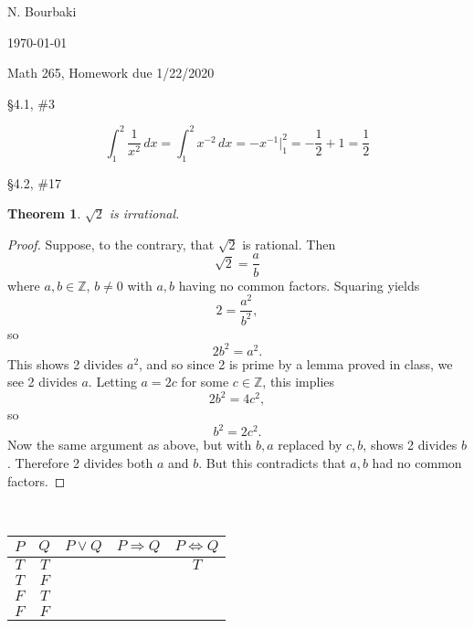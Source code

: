 \documentclass[11pt]{report}
\theoremstyle{plain}
\newtheorem{thm}{Theorem}
\begin{document}
\hfill N. Bourbaki

\hfill \today

\begin{center}
Math 265, Homework due 1/22/2020
\end{center}
\begin{description}
\item{\S 4.1, \#3}

$$\int_1^2 \frac 1 {x^2} \, dx=\int_1^2 x^{-2} \, dx=-x^{-1} \Big |_1^2=-\frac 12+1=\frac 12$$

\item{\S 4.2, \#17}

\begin{thm} $\sqrt 2$ is irrational.
\end{thm}
\begin{proof}
Suppose, to the contrary, that $\sqrt 2$ is rational. Then
$$\sqrt 2=\frac ab$$
where $a,b\in \mathbb Z$, $b\not = 0$ with $a,b$ having no common factors. Squaring yields
$$2=\frac {a^2}{b^2},$$
so
$$2b^2=a^2.$$
This shows 2 divides $a^2$, and so since 2 is prime by a lemma proved in class, we see 2 divides $a$. Letting $a=2c$ for some $c\in \mathbb Z$, this implies
$$2b^2=4c^2,$$ so
$$b^2=2c^2.$$
Now the same argument as above, but with $b,a$ replaced by $c,b$, shows 2 divides $b$. Therefore 2 divides both $a$ and $b$. But this contradicts that $a,b$ had no common factors.
\end{proof}


\item[\S 99.99, \#99]

\ 

\begin{tabular}{c|c|c|c|c}

$P$ & $Q$ & $P\lor Q$ & $P\Rightarrow Q$ & $P \iff Q$ \\
\hline
$T$  & $T$ & & & $T$ \\
$T$  & $F$ & & & \\
$F$  & $T$ & & & \\
$F$  & $F$ & & & \\
\end{tabular}


\end{description}
\end{document}
